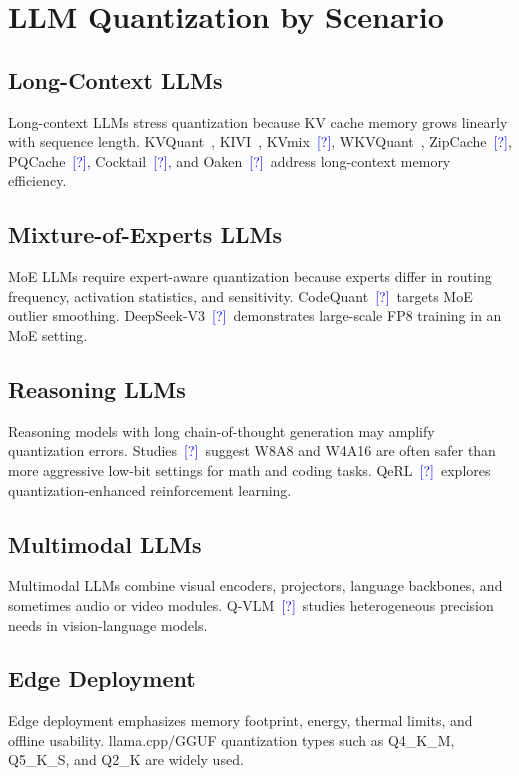 \documentclass[journal,10pt]{IEEEtran}
\newcommand{\CITE}{\textcolor{blue}{[?]}}
\begin{document}
\section{LLM Quantization by Scenario}

\subsection{Long-Context LLMs}
Long-context LLMs stress quantization because KV cache memory grows linearly with sequence length. KVQuant~\cite{hooper2024kvquant}, KIVI~\cite{liu2024kivi}, KVmix~\CITE, WKVQuant~\cite{hooper2024kvquant}, ZipCache~\CITE, PQCache~\CITE, Cocktail~\CITE, and Oaken~\CITE\ address long-context memory efficiency.

\subsection{Mixture-of-Experts LLMs}
MoE LLMs require expert-aware quantization because experts differ in routing frequency, activation statistics, and sensitivity. CodeQuant~\CITE\ targets MoE outlier smoothing. DeepSeek-V3~\CITE\ demonstrates large-scale FP8 training in an MoE setting.

\subsection{Reasoning LLMs}
Reasoning models with long chain-of-thought generation may amplify quantization errors. Studies~\CITE\ suggest W8A8 and W4A16 are often safer than more aggressive low-bit settings for math and coding tasks. QeRL~\CITE\ explores quantization-enhanced reinforcement learning.

\subsection{Multimodal LLMs}
Multimodal LLMs combine visual encoders, projectors, language backbones, and sometimes audio or video modules. Q-VLM~\CITE\ studies heterogeneous precision needs in vision-language models.

\subsection{Edge Deployment}
Edge deployment emphasizes memory footprint, energy, thermal limits, and offline usability. llama.cpp/GGUF quantization types such as Q4\_K\_M, Q5\_K\_S, and Q2\_K are widely used.
\end{document}
